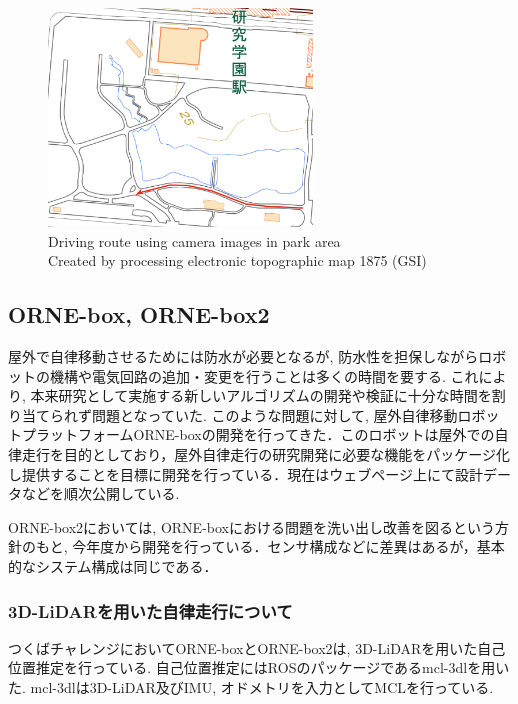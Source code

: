 \documentclass[uplatex, twocolumn, 9pt]{jsproceedings}
\begin{document}
\begin{figure}[h]
  \centering
  \includegraphics[width=70mm]{fig/dist220.pdf}
  \caption{Driving route using camera images in park area\\Created by processing electronic topographic map 1875 (GSI)}
  \label{fig:dist220}%
\end{figure}

\newpage
\subsection{ORNE-box, ORNE-box2}
屋外で自律移動させるためには防水が必要となるが, 防水性を担保しながらロボットの機構や電気回路の追加・変更を行うことは多くの時間を要する. これにより, 本来研究として実施する新しいアルゴリズムの開発や検証に十分な時間を割り当てられず問題となっていた. このような問題に対して, 屋外自律移動ロボットプラットフォームORNE-boxの開発\cite{si-box}を行ってきた．このロボットは屋外での自律走行を目的としており，屋外自律走行の研究開発に必要な機能をパッケージ化し提供することを目標に開発を行っている．現在はウェブページ上\cite{box}にて設計データなどを順次公開している. \par 
ORNE-box2においては, ORNE-boxにおける問題を洗い出し改善を図るという方針のもと, 今年度から開発を行っている．センサ構成などに差異はあるが，基本的なシステム構成は同じである．

\subsubsection{3D-LiDARを用いた自律走行について}
つくばチャレンジにおいてORNE-boxとORNE-box2は, 3D-LiDARを用いた自己位置推定を行っている. 自己位置推定にはROSのパッケージであるmcl-3dl\cite{mcl-3dl}を用いた. mcl-3dlは3D-LiDAR及びIMU, オドメトリを入力としてMCLを行っている.
\end{document}
